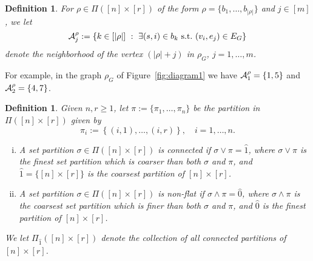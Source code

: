 \documentclass[12pt]{article}
\newtheorem{definition}[prop]{Definition}
\numberwithin{equation}{section}
\begin{document}
\begin{definition}
  For $\rho\in\Pi ([n]\times[r])$ of the form
  $\rho = \{ b_1,\ldots , b_{|\rho |}\}$ 
  and $j \in [m]$, we let 
\begin{equation}
\nonumber
    {\cal A}^\rho_j:=\{ k \in [ |\rho | ] \ : \ \exists (s,i)\in b_k ~\mathrm{s.t.}~
    (v_i,e_j) \in E_G %
    \} 
\end{equation} 
denote the neighborhood of the vertex $(|\rho | + j)$ in $\rho_G$,
$j=1,\ldots , m$.
 \end{definition}
 For example, in the graph $\rho_G$ of Figure~\ref{fig:diagram1}
 we have ${\cal A}^\rho_1=\{1,5\}$ and ${\cal A}^\rho_2=\{4,7\}$. 
 \begin{definition}
   \label{def-1}
   Given $n,r\geq 1$,
  let $\pi:=\{\pi_1, \ldots ,\pi_n\}$ be the partition in $\Pi ([n]\times[r])$
  given by 
  $$
  \pi_i:=\left\{(i,1), \ldots ,(i,r)\right\},
  \quad
  i=1, \ldots , n.
  $$
 \begin{enumerate}[i)]
   \item A set partition $\sigma\in\Pi ([n]\times[r])$ is connected if $\sigma\vee\pi=\widehat{1}$, 
     where
     $\sigma \vee\pi$ is the finest set partition which is coarser than both
     $\sigma$ and $\pi$, and $\widehat{1} = \{ [n]\times [r] \}$
is the coarsest partition of $[n]\times [r]$. 
\item 
 A set partition $\sigma\in\Pi ([n]\times[r])$ is non-flat if $\sigma\wedge\pi=\widehat{0}$,
 where
 $\sigma \wedge\pi$ is
 the coarsest set partition which is finer than both $\sigma$ and $\pi$,
 and $\widehat{0}$ is the finest partition of $[n]\times [r]$.
\end{enumerate} 
 We let $\Pi_{\widehat{1}} ([n]\times[r])$ denote the collection of all
connected partitions of $[n] \times [r]$. 
\end{definition}
\end{document}

